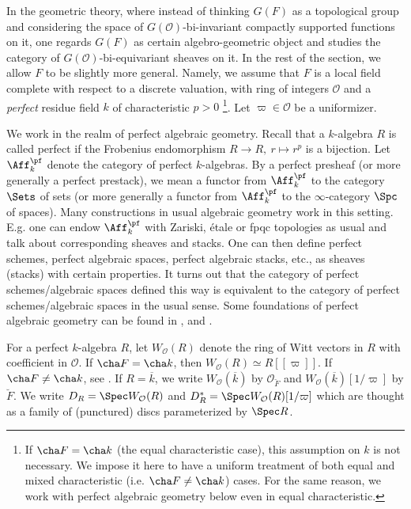 \documentclass[11pt]{amsart}
\theoremstyle{definition}
\theoremstyle{definition}
\theoremstyle{definition}
\numberwithin{equation}{section}
\newcommand{\mO}{{\mathcal O}}
\begin{document}
In the geometric theory, where instead of thinking $G(F)$ as a topological group and considering the space of $G(\mO)$-bi-invariant compactly supported functions on it, one regards $G(F)$ as certain algebro-geometric object and studies the category of $G(\mO)$-bi-equivariant sheaves on it. 
In the rest of the section, we allow $F$ to be slightly more general. Namely, we assume that
$F$ is a local field complete with respect to a discrete valuation, with ring of integers $\mO$ and a \emph{perfect} residue field $k$ of characteristic $p>0$ \footnote{If $\cha F=\cha k$ (the equal characteristic case), this assumption on $k$ is not necessary. We impose it here to have a uniform treatment of both equal and mixed characteristic (i.e. $\cha F\neq \cha k$) cases. For the same reason, we work with perfect algebraic geometry below even in equal characteristic.}. Let $\varpi\in\mO$ be a uniformizer. 

We work in the realm of perfect algebraic geometry. 
Recall that a $k$-algebra $R$ is called perfect if the Frobenius endomorphism $R\to R, \ r\mapsto r^p$ is a bijection. Let $\Aff_k^\pf$ denote the category of perfect $k$-algebras. By a perfect presheaf (or more generally a perfect prestack), we mean a functor from $\Aff_k^\pf$ to the category $\Sets$ of sets (or more generally a functor from $\Aff_k^\pf$ to the $\infty$-category $\Spc$ of spaces).  
Many constructions in usual algebraic geometry work in this setting. E.g. one can endow $\Aff_k^\pf$ with Zariski, \'etale or fpqc topologies as usual and talk about corresponding sheaves and stacks. One can then define perfect schemes, perfect algebraic spaces, perfect algebraic stacks, etc., as sheaves (stacks) with certain properties. It turns out that the category of perfect schemes/algebraic spaces defined this way is equivalent to the category of perfect schemes/algebraic spaces in the usual sense.
Some foundations of perfect algebraic geometry can be found in \cite[Appendix A]{Zhu-Satake-Mixed}, \cite{Bhatt-Scholze-Witt} and \cite[\S A.1]{Xiao-Zhu-Cycle}.

For a perfect $k$-algebra $R$, let $W_\mO(R)$ denote the ring of Witt vectors in $R$ with coefficient in $\mO$. If $\cha F=\cha k$, then $W_\mO(R)\simeq R[[\varpi]]$. If $\cha F\neq \cha k$, see \cite[Sect. 0.5]{Zhu-Satake-Mixed}.
If $R=\overline k$, we write $W_\mO(\overline k)$ by $\mO_{\breve F}$ and $W_{\mO}(\overline k)[1/\varpi]$ by $\breve F$.
We write $D_R=\Spec W_\mO(R)$ and $D_R^*=\Spec W_\mO(R)[1/\varpi]$
which are thought as a family of (punctured) discs parameterized by $\Spec R$. 
\end{document}
